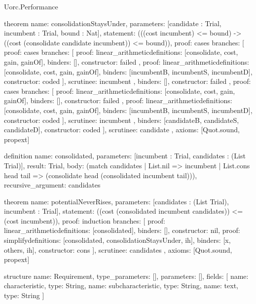 \begin{lexlean}{Uorc.Performance}
\begin{semanticmodule}
theorem{
  name: consolidationStaysUnder,
  parameters: [candidate : Trial, incumbent : Trial, bound : Nat],
  statement: (((cost incumbent) <= bound) -> ((cost (consolidate candidate incumbent)) <= bound)),
  proof: cases{
    branches: [
      {
        proof: cases{
          branches: [
            {
              proof: linear_arithmetic{definitions: [consolidate, cost, gain, gainOf]},
              binders: [],
              constructor: failed
            },
            {
              proof: linear_arithmetic{definitions: [consolidate, cost, gain, gainOf]},
              binders: [incumbentB, incumbentS, incumbentD],
              constructor: coded
            }
          ],
          scrutinee: incumbent
        },
        binders: [],
        constructor: failed
      },
      {
        proof: cases{
          branches: [
            {
              proof: linear_arithmetic{definitions: [consolidate, cost, gain, gainOf]},
              binders: [],
              constructor: failed
            },
            {
              proof: linear_arithmetic{definitions: [consolidate, cost, gain, gainOf]},
              binders: [incumbentB, incumbentS, incumbentD],
              constructor: coded
            }
          ],
          scrutinee: incumbent
        },
        binders: [candidateB, candidateS, candidateD],
        constructor: coded
      }
    ],
    scrutinee: candidate
  },
  axioms: [Quot.sound, propext]
}

definition{
  name: consolidated,
  parameters: [incumbent : Trial, candidates : (List Trial)],
  result: Trial,
  body: (match candidates
    | List.nil => incumbent
    | List.cons head tail => (consolidate head (consolidated incumbent tail))),
  recursive_argument: candidates
}

theorem{
  name: potentialNeverRises,
  parameters: [candidates : (List Trial), incumbent : Trial],
  statement: ((cost (consolidated incumbent candidates)) <= (cost incumbent)),
  proof: induction{
    branches: [
      {proof: linear_arithmetic{definitions: [consolidated]}, binders: [], constructor: nil},
      {
        proof: simplify{definitions: [consolidated, consolidationStaysUnder, ih]},
        binders: [x, others, ih],
        constructor: cons
      }
    ],
    scrutinee: candidates
  },
  axioms: [Quot.sound, propext]
}

structure{
  name: Requirement,
  type_parameters: [],
  parameters: [],
  fields: [
    {name: characteristic, type: String},
    {name: subcharacteristic, type: String},
    {name: text, type: String}
  ]
}


\end{semanticmodule}
\end{lexlean}
